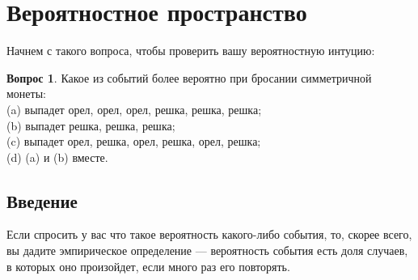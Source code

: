 \documentclass[11 pt,russian]{article}
\begin{document}
\newenvironment{enumerate*}%
  {\begin{enumerate}%
    \setlength{\itemsep}{1pt}%
    \setlength{\parskip}{1pt}}%
  {\end{enumerate}}
  \newtheorem{Th}{Теорема}
  \theoremstyle{definition}
  \newtheorem{Rem}{Замечание}
  \newtheorem{Que}{Вопрос}
  \newtheorem{Exam}{Пример}
    \newtheorem{Def}{Определение}
\section{Вероятностное пространство}
Начнем с такого вопроса, чтобы проверить вашу вероятностную интуцию:
\begin{Que}
Какое из событий более вероятно при бросании симметричной монеты:\\
(a) выпадет орел, орел, орел, решка, решка, решка;\\
(b) выпадет решка, решка, решка;\\
(c) выпадет орел, решка, орел, решка, орел, решка;\\
(d) (a) и (b) вместе.
\end{Que}
\subsection{Введение}
Если спросить у вас что такое вероятность какого-либо события, то, скорее всего, вы дадите эмпирическое определение --- вероятность события есть доля случаев, в которых оно произойдет, если много раз его повторять.
\end{document}
